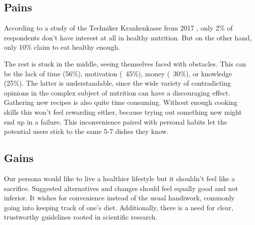 \subsection*{Pains}
According to a study of the Techniker Krankenkasse from 2017 \autocite{katja_wohlers_iss_2017}, only 2\% of respondents don't have interest at all in healthy nutrition. But on the other hand, only 10\% claim to eat healthy enough. 

The rest is stuck in the middle, seeing themselves faced with obstacles. This can be the lack of time (56\%), motivation (~45\%), money (~30\%), or knowledge (25\%). The latter is understandable, since the wide variety of contradicting opinions in the complex subject of nutrition can have a discouraging effect. Gathering new recipes is also quite time consuming. Without enough cooking skills this won't feel rewarding either, because trying out something new might end up in a failure. This inconvenience paired with personal habits let the potential users stick to the same 5-7 dishes they know.

\subsection*{Gains}
Our persona would like to live a healthier lifestyle but it shouldn’t feel like a sacrifice. Suggested alternatives and changes should feel equally good and not inferior. It wishes for convenience instead of the usual handiwork, commonly going into keeping track of one's diet. Additionally, there is a need for clear, trustworthy guidelines rooted in scientific research.
